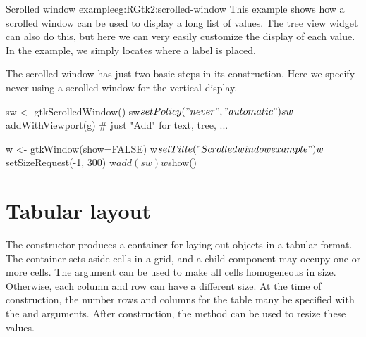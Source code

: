 \begin{example}{Scrolled window example}{eg:RGtk2:scrolled-window}
This example shows how a scrolled window can be used to display a long list of values. The tree view
widget can also do this, but here we can very easily customize the display of each value. In the example, we simply locates where a label is placed.


\begin{Schunk}
\end{Schunk}

The scrolled window has just two basic steps in its construction. Here
we specify never using a scrolled window for the vertical display.
\begin{Schunk}
\begin{Sinput}
 sw <- gtkScrolledWindow()
 sw$setPolicy("never","automatic")
 sw$addWithViewport(g)                   # just "Add" for text, tree, ...
\end{Sinput}
\end{Schunk}

\begin{Schunk}
\begin{Sinput}
 w <- gtkWindow(show=FALSE)
 w$setTitle("Scrolled window example")
 w$setSizeRequest(-1, 300)
 w$add(sw)
 w$show()
\end{Sinput}
\end{Schunk}
\end{example}

\section{Tabular layout}
\label{sec:RGtk2:gtkTable}

The  constructor produces a container for laying
out objects in a tabular format. The container sets aside cells in a
grid, and a child component may occupy one or more cells. The
 argument can be used to make all
cells homogeneous in size. Otherwise, each column and row can have a
different size. At the time of construction, the number rows and
columns for the table many be specified with the
 and 
arguments. After construction, the  method
can be used to resize these values.


